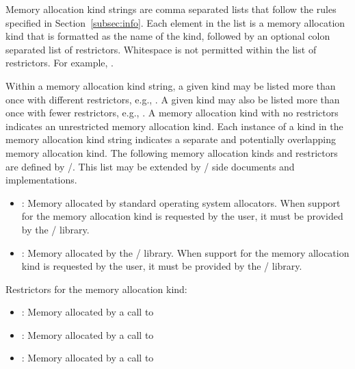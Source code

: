 Memory allocation kind strings are comma separated lists that follow the
rules specified in Section~\ref{subsec:info}. Each element in the list is a
memory allocation kind that is formatted as the name of the kind, followed by
an optional colon separated list of restrictors. Whitespace is not permitted within
the list of restrictors.
For example,
.

Within a memory allocation kind string, a given kind may be listed more than
once with different restrictors, e.g., .
A given kind may also be listed more than
once with fewer restrictors, e.g., .
A memory allocation kind with no restrictors indicates an unrestricted memory
allocation kind.
Each instance of a kind in the memory allocation kind string indicates a
separate and potentially overlapping memory allocation kind.
The following memory allocation kinds and restrictors are defined by \MPI/. This list may be extended by
\MPI/ side documents and implementations.

\begin{itemize}
    \item {}: Memory allocated by standard operating system allocators.
        When support for the  memory allocation kind is requested by the
        user, it must be provided by the \MPI/ library.
    \item {}: Memory allocated by the \MPI/ library.
        When support for the  memory allocation kind is requested by the
        user, it must be provided by the \MPI/ library.
\end{itemize}

Restrictors for the  memory allocation kind:
\begin{itemize}
    \item {}: Memory allocated by a call to 
    \item {}: Memory allocated by a call to 
    \item {}: Memory allocated by a call to 
\end{itemize}

